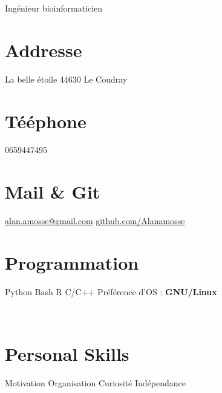 \documentclass[]{friggeri-cv}
\begin{document}
      {Ingénieur bioinformaticien}
      

\begin{aside}
  \section{Addresse}
    La belle étoile
    44630 Le Coudray
    ~
  \section{Tééphone}
    0659447495
    ~
  \section{Mail \& Git}
    \href{mailto:alan.amosse@gmail.com}{alan.amosse@gmail.com}
    \href{https://github.com/Alanamosse}{github.com/Alanamosse}
    ~
  \section{Programmation}
    Python
    Bash
    R
    C/C++
    Préférence d'OS : \textbf{GNU/Linux}
   
    ~
  \section{Personal Skills}
    Motivation
    Organisation
    Curiosité
    Indépendance
    ~
\end{aside}
\end{document}
